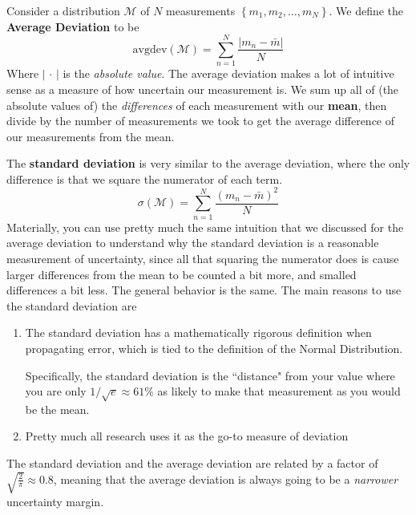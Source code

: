 \documentclass{article}
\begin{document}
\begin{definition}
  Consider a distribution $\mathcal{M}$ of $N$ measurements $\left\{m_1,m_2,\ldots,m_N\right\}$. We define the \textbf{Average Deviation} to be
  \begin{equation}
    \mathrm{avgdev}\left(\mathcal{M}\right)=\sum\limits_{n=1}^{N} \frac{\left|m_n-\bar{m}\right|}{N}\label{avgdev}
  \end{equation}
  Where $\left| \, \cdot \, \right|$ is the {\color{blue} \emph{absolute value}}. The average deviation makes a lot of intuitive sense as a measure of how uncertain our measurement is.
  We sum up all of (the absolute values of) the \emph{differences} of each measurement with our \textbf{mean}, then divide by the number of measurements we took to get the average difference of our measurements from the mean.

  The \textbf{standard deviation} is very similar to the average deviation, where the only difference is that we square the numerator of each term.
  \begin{equation}
    \sigma\left(\mathcal{M}\right)=\sum\limits_{n=1}^{N} \frac{\left(m_n- \bar{m}\right)^{2}}{N}\label{eq:stdev}
  \end{equation}
  Materially, you can use pretty much the same intuition that we discussed for the average deviation to understand why the standard deviation is a reasonable measurement of uncertainty, since all that squaring the numerator does is cause larger differences from the mean to be counted a bit more, and smalled differences a bit less. The general behavior is the same.
  The main reasons to use the standard deviation are
  \begin{enumerate}
    \item The standard deviation has a mathematically rigorous definition when propagating error, which is tied to the definition of the Normal Distribution.

      Specifically, the standard deviation is the ``distance" from your value where you are only $1/\sqrt{e}\approx 61\%$ as likely to make that measurement as you would be the mean.
    \item Pretty much all research uses it as the go-to measure of deviation
  \end{enumerate}

\end{definition}

The standard deviation and the average deviation are related by a factor of $\sqrt{\frac{2}{\pi}}\approx 0.8$, meaning that the average deviation is always going to be a \emph{narrower} uncertainty margin.
\end{document}
